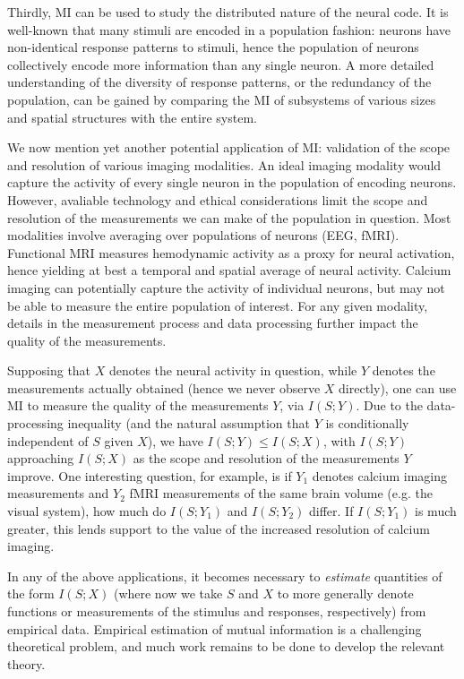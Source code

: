 \documentclass[12pt]{article}
\begin{document}
Thirdly, MI can be used to study the distributed nature of the neural
code.  It is well-known that many stimuli are encoded in a population
fashion: neurons have non-identical response patterns to stimuli,
hence the population of neurons collectively encode more information
than any single neuron.  A more detailed understanding of the diversity
of response patterns, or the redundancy of the population, can be gained
by comparing the MI of subsystems of various sizes and spatial structures
with the entire system.

We now mention yet another potential application of MI: validation of
the scope and resolution of various imaging modalities.  An ideal
imaging modality would capture the activity of every single neuron in
the population of encoding neurons.  However, avaliable technology and
ethical considerations limit the scope and resolution of the
measurements we can make of the population in question.  Most
modalities involve averaging over populations of neurons (EEG, fMRI).
Functional MRI measures hemodynamic activity as a proxy for neural
activation, hence yielding at best a temporal and spatial average of
neural activity.  Calcium imaging can potentially capture the activity
of individual neurons, but may not be able to measure the entire
population of interest.  For any given modality, details in the
measurement process and data processing further impact the quality of
the measurements.

Supposing that $X$ denotes the neural activity in question, while $Y$
denotes the measurements actually obtained (hence we never observe $X$
directly), one can use MI to measure the quality of the measurements
$Y$, via $I(S; Y)$.  Due to the data-processing inequality (and the
natural assumption that $Y$ is conditionally independent of $S$ given
$X$), we have $I(S; Y) \leq I(S; X)$, with $I(S; Y)$ approaching $I(S;
X)$ as the scope and resolution of the measurements $Y$ improve.  One
interesting question, for example, is if $Y_1$ denotes calcium imaging
measurements and $Y_2$ fMRI measurements of the same brain volume
(e.g. the visual system), how much do $I(S; Y_1)$ and $I(S; Y_2)$
differ.  If $I(S; Y_1)$ is much greater, this lends support to the
value of the increased resolution of calcium imaging.

In any of the above applications, it becomes necessary
to \emph{estimate} quantities of the form $I(S; X)$ (where now we take
$S$ and $X$ to more generally denote functions or measurements of the
stimulus and responses, respectively) from empirical data.  Empirical
estimation of mutual information is a challenging theoretical problem,
and much work remains to be done to develop the relevant theory.
\end{document}
